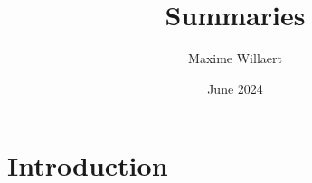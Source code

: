 \documentclass{article}
\title{Summaries}
\author{Maxime Willaert}
\date{June 2024}
\theoremstyle{definition}
\begin{document}
\maketitle

\tableofcontents

\section{Introduction}
\end{document}
